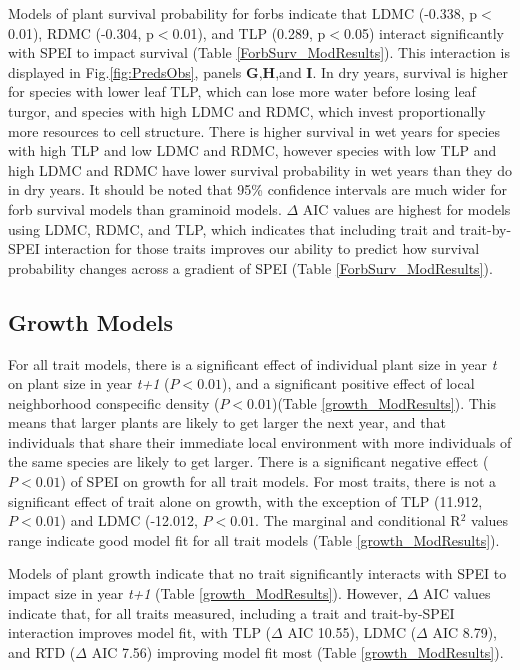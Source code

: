 \documentclass[12pt, letterpaper]{article}
\begin{document}
Models of plant survival probability for forbs indicate that LDMC (-0.338, p$<$0.01), RDMC (-0.304, p$<$0.01), and TLP (0.289, p$<$0.05) interact significantly with SPEI to impact survival (Table \ref{ForbSurv_ModResults}). This interaction is displayed in Fig.\ref{fig:PredsObs}, panels \textbf{G},\textbf{H},and \textbf{I}. In dry years, survival is higher for species with lower leaf TLP, which can lose more water before losing leaf turgor, and species with high LDMC and RDMC, which invest proportionally more resources to cell structure. There is higher survival in wet years for species with high TLP and low LDMC and RDMC, however species with low TLP and high LDMC and RDMC have lower survival probability in wet years than they do in dry years. It should be noted that 95\% confidence intervals are much wider for forb survival models than graminoid models. $\Delta$ AIC values are highest for models using LDMC, RDMC, and TLP, which indicates that including trait and trait-by-SPEI interaction for those traits improves our ability to predict how survival probability changes across a gradient of SPEI (Table \ref{ForbSurv_ModResults}). 


\subsection{Growth Models} 
 For all trait models, there is a significant effect of individual plant size in year \textit{t} on plant size in year \textit{t+1} ($P<0.01$), and a significant positive effect of local neighborhood conspecific density ($P<0.01$)(Table \ref{growth_ModResults}). This means that larger plants are likely to get larger the next year, and that individuals that share their immediate local environment with more individuals of the same species are likely to get larger. %
 There is a significant negative effect ($P<0.01$) of SPEI on growth for all trait models. For most traits, there is not a significant effect of trait alone on growth, with the exception of TLP (11.912, $P<0.01$) and LDMC (-12.012, $P<0.01$. The marginal and conditional R$^2$ values range indicate good model fit for all trait models (Table \ref{growth_ModResults}).

Models of plant growth indicate that no trait significantly interacts with SPEI to impact size in year \textit{t+1} (Table \ref{growth_ModResults}). However, $\Delta$ AIC values indicate that, for all traits measured, including a trait and trait-by-SPEI interaction improves model fit, with TLP ($\Delta$ AIC 10.55), LDMC ($\Delta$ AIC 8.79), and RTD ($\Delta$ AIC 7.56) improving model fit most (Table \ref{growth_ModResults}).  
\end{document}
